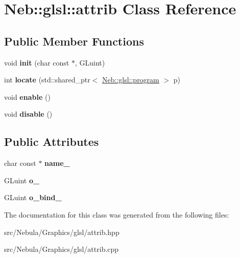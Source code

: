 \hypertarget{classNeb_1_1glsl_1_1attrib}{\section{\-Neb\-:\-:glsl\-:\-:attrib \-Class \-Reference}
\label{classNeb_1_1glsl_1_1attrib}
}
\subsection*{\-Public \-Member \-Functions}
\begin{DoxyCompactItemize}
\item 
\hypertarget{classNeb_1_1glsl_1_1attrib_ad6cd70902fcafda280444fa1aed5d7f9}{void {\bfseries init} (char const $\ast$, \-G\-Luint)}\label{classNeb_1_1glsl_1_1attrib_ad6cd70902fcafda280444fa1aed5d7f9}

\item 
\hypertarget{classNeb_1_1glsl_1_1attrib_a3b71ba9f92059ba212b3fe9d95c2235d}{int {\bfseries locate} (std\-::shared\-\_\-ptr$<$ \hyperlink{classNeb_1_1glsl_1_1program}{\-Neb\-::glsl\-::program} $>$ p)}\label{classNeb_1_1glsl_1_1attrib_a3b71ba9f92059ba212b3fe9d95c2235d}

\item 
\hypertarget{classNeb_1_1glsl_1_1attrib_a787f4a60c290234fd0f6dc3b17df090c}{void {\bfseries enable} ()}\label{classNeb_1_1glsl_1_1attrib_a787f4a60c290234fd0f6dc3b17df090c}

\item 
\hypertarget{classNeb_1_1glsl_1_1attrib_a01fc89c183e17a5878e5bfc0ccc613c9}{void {\bfseries disable} ()}\label{classNeb_1_1glsl_1_1attrib_a01fc89c183e17a5878e5bfc0ccc613c9}

\end{DoxyCompactItemize}
\subsection*{\-Public \-Attributes}
\begin{DoxyCompactItemize}
\item 
\hypertarget{classNeb_1_1glsl_1_1attrib_ace010923299383f6c7f9023906597238}{char const $\ast$ {\bfseries name\-\_\-}}\label{classNeb_1_1glsl_1_1attrib_ace010923299383f6c7f9023906597238}

\item 
\hypertarget{classNeb_1_1glsl_1_1attrib_aa37e743b20a0e901d3274f4b88497195}{\-G\-Luint {\bfseries o\-\_\-}}\label{classNeb_1_1glsl_1_1attrib_aa37e743b20a0e901d3274f4b88497195}

\item 
\hypertarget{classNeb_1_1glsl_1_1attrib_acef1f0c5eb1de70001f4590e33eb9631}{\-G\-Luint {\bfseries o\-\_\-bind\-\_\-}}\label{classNeb_1_1glsl_1_1attrib_acef1f0c5eb1de70001f4590e33eb9631}

\end{DoxyCompactItemize}


\-The documentation for this class was generated from the following files\-:\begin{DoxyCompactItemize}
\item 
src/\-Nebula/\-Graphics/glsl/attrib.\-hpp\item 
src/\-Nebula/\-Graphics/glsl/attrib.\-cpp\end{DoxyCompactItemize}
